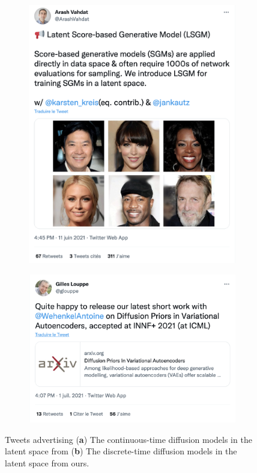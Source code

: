 \begin{figure}
  \centering
  \begin{subfigure}[b]{.48\textwidth}
    \centering
    \includegraphics[width=.95\textwidth]{figures/impact_scholar/cont_diff_tweet.png}
    \caption{}
    \label{fig:cont_tweet}
  \end{subfigure}
  \begin{subfigure}[b]{.48\textwidth}
    \centering
    \includegraphics[width=.95\textwidth]{figures/impact_scholar/discret_diff_tweet.png}
    \caption{}
    \label{fig:discrete_tweet}
  \end{subfigure}
  \caption{Tweets advertising (\textbf{a}) The continuous-time diffusion models in the latent space from \citet{vahdat2021score} (\textbf{b}) The discrete-time diffusion models in the latent space from ours.}
\end{figure}

